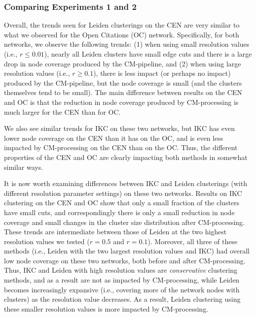 \documentclass[11pt]{article}   	%
\begin{document}
\subsubsection{Comparing Experiments 1 and 2}
Overall, the  trends seen for Leiden clusterings on the CEN are  very similar to what we observed for the Open Citations (OC) network.
Specifically, for both networks, we observe the following  trends: (1) when using small resolution values (i.e., $r \leq 0.01$),  nearly all Leiden clusters have small edge cuts and there is a large drop in node coverage produced by the CM-pipeline, and  (2) when using
large resolution values (i.e., $r \geq 0.1$), there is less impact (or perhaps no impact) produced by the CM-pipeline, but the node coverage is small (and the clusters themselves tend to be small).
The main difference between results on the CEN and OC is that the reduction in node coverage produced by CM-processing is
much larger  for the CEN than for OC.

We also see similar trends for IKC on these two networks, but IKC has even lower node coverage on the CEN than it has on the OC, and is even less impacted by CM-processing on the CEN than on the OC.
Thus, the different properties of the CEN and OC are clearly impacting both methods in somewhat similar ways.

It is now worth examining differences between IKC and Leiden clusterings (with different resolution parameter settings) on these two networks.
Results on IKC clustering on the CEN and OC show that only a small fraction of the clusters have small cuts, and correspondingly
there is only a small reduction in node coverage and small changes in the cluster size distribution after CM-processing. 
These trends  are intermediate between those of Leiden at the two highest resolution values we tested ($r=0.5$ and $r=0.1$).
Moreover, all three of these methods (i.e., Leiden with the two largest resolution values and IKC) had overall low node coverage on these two networks, both before and after CM-processing.
Thus, IKC and Leiden with high resolution values are {\em conservative} clustering methods, and as a result are not as impacted by CM-processing, 
while Leiden becomes increasingly expansive (i.e., covering more of the network nodes with clusters) as the resolution value decreases. 
As a result, Leiden clustering using these smaller resolution values is more impacted by CM-processing.
\end{document}
